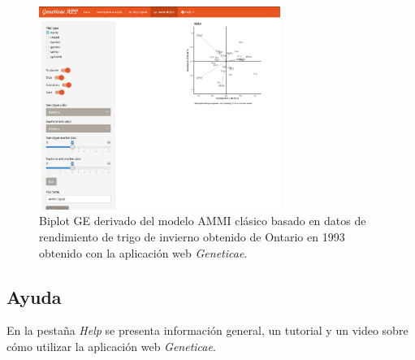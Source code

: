 \begin{figure}[H]
	\begin{center}
		\includegraphics[width=0.70\textwidth]{./Graficos/AMMI_GE.png}
	\end{center}
	\caption{Biplot GE derivado del modelo AMMI clásico basado en datos de rendimiento de trigo de invierno obtenido de Ontario en 1993 obtenido con la aplicación web \emph{Geneticae}.}
	\label{fig:figammiapp}
\end{figure}


\subsection{Ayuda}

En la pestaña \emph{Help} se presenta información general, un tutorial y un video sobre cómo utilizar la aplicación web \emph{Geneticae}.
